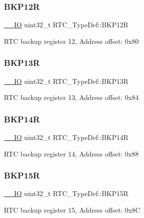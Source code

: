 \subsubsection{\texorpdfstring{BKP12R}{BKP12R}}
{\footnotesize\ttfamily \mbox{\hyperlink{core__sc300_8h_aec43007d9998a0a0e01faede4133d6be}{\+\_\+\+\_\+\+IO}} uint32\+\_\+t R\+T\+C\+\_\+\+Type\+Def\+::\+B\+K\+P12R}

R\+TC backup register 12, Address offset\+: 0x80 \mbox{\label{struct_r_t_c___type_def_a138903d4681455a660dccbaf3409263d}} 
\subsubsection{\texorpdfstring{BKP13R}{BKP13R}}
{\footnotesize\ttfamily \mbox{\hyperlink{core__sc300_8h_aec43007d9998a0a0e01faede4133d6be}{\+\_\+\+\_\+\+IO}} uint32\+\_\+t R\+T\+C\+\_\+\+Type\+Def\+::\+B\+K\+P13R}

R\+TC backup register 13, Address offset\+: 0x84 \mbox{\label{struct_r_t_c___type_def_adaae50f5c3213014fb9818eaee389676}} 
\subsubsection{\texorpdfstring{BKP14R}{BKP14R}}
{\footnotesize\ttfamily \mbox{\hyperlink{core__sc300_8h_aec43007d9998a0a0e01faede4133d6be}{\+\_\+\+\_\+\+IO}} uint32\+\_\+t R\+T\+C\+\_\+\+Type\+Def\+::\+B\+K\+P14R}

R\+TC backup register 14, Address offset\+: 0x88 \mbox{\label{struct_r_t_c___type_def_a797f43f9cc1858baebd1799be288dff6}} 
\subsubsection{\texorpdfstring{BKP15R}{BKP15R}}
{\footnotesize\ttfamily \mbox{\hyperlink{core__sc300_8h_aec43007d9998a0a0e01faede4133d6be}{\+\_\+\+\_\+\+IO}} uint32\+\_\+t R\+T\+C\+\_\+\+Type\+Def\+::\+B\+K\+P15R}

R\+TC backup register 15, Address offset\+: 0x8C \mbox{\label{struct_r_t_c___type_def_a181ad73082bde7d74010aac16bd373fc}} 
